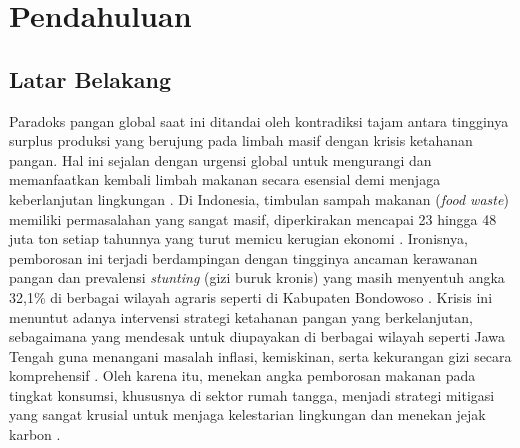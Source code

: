 
\chapter{Pendahuluan}
\label{chapter:pendahuluan}
\section{Latar Belakang}
Paradoks pangan global saat ini ditandai oleh kontradiksi tajam antara tingginya surplus produksi yang berujung pada limbah masif dengan krisis ketahanan pangan. Hal ini sejalan dengan urgensi global untuk mengurangi dan memanfaatkan kembali limbah makanan secara esensial demi menjaga keberlanjutan lingkungan \cite{raiEssentialRecyclingRepurposing2025a}. Di Indonesia, timbulan sampah makanan (\textit{food waste}) memiliki permasalahan yang sangat masif, diperkirakan mencapai 23 hingga 48 juta ton setiap tahunnya yang turut memicu kerugian ekonomi \cite{yulianaPotensiGerakanFood2022b}. Ironisnya, pemborosan ini terjadi berdampingan dengan tingginya ancaman kerawanan pangan dan prevalensi \textit{stunting} (gizi buruk kronis) yang masih menyentuh angka 32,1\% di berbagai wilayah agraris seperti di Kabupaten Bondowoso \cite{prayitnoExploringRoleFood2025b}. Krisis ini menuntut adanya intervensi strategi ketahanan pangan yang berkelanjutan, sebagaimana yang mendesak untuk diupayakan di berbagai wilayah seperti Jawa Tengah guna menangani masalah inflasi, kemiskinan, serta kekurangan gizi secara komprehensif \cite{pujiyantoStrategiKetahananPangan2025b}. Oleh karena itu, menekan angka pemborosan makanan pada tingkat konsumsi, khususnya di sektor rumah tangga, menjadi strategi mitigasi yang sangat krusial untuk menjaga kelestarian lingkungan dan menekan jejak karbon \cite{liuExploringHouseholdFood2023b}.

